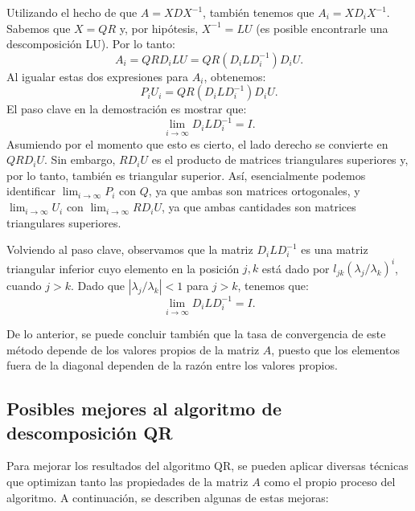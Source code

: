 Utilizando el hecho de que \( A = XDX^{-1} \), también tenemos que \( A_i = X D_i X^{-1} \). Sabemos que \( X = QR \) y, por hipótesis, \( X^{-1} = LU \) (es posible encontrarle una descomposición LU). Por lo tanto:
\[
A_i = QR D_i LU = QR(D_i L D_i^{-1})D_i U.
\]
Al igualar estas dos expresiones para \( A_i \), obtenemos:
\[
P_i U_i = QR(D_i L D_i^{-1})D_i U.
\]
El paso clave en la demostración es mostrar que:
\[
\lim_{i \to \infty} D_i L D_i^{-1} = I.
\]
Asumiendo por el momento que esto es cierto, el lado derecho se convierte en \( QR D_i U \). Sin embargo, \( R D_i U \) es el producto de matrices triangulares superiores y, por lo tanto, también es triangular superior. Así, esencialmente podemos identificar \( \lim_{i \to \infty} P_i \) con \( Q \), ya que ambas son matrices ortogonales, y \( \lim_{i \to \infty} U_i \) con \( \lim_{i \to \infty} R D_i U \), ya que ambas cantidades son matrices triangulares superiores. 

Volviendo al paso clave, observamos que la matriz \( D_i L D_i^{-1} \) es una matriz triangular inferior cuyo elemento en la posición \( j, k \) está dado por \( l_{jk}(\lambda_j / \lambda_k)^i \), cuando \( j > k \). Dado que \( |\lambda_j / \lambda_k| < 1 \) para \( j > k \), tenemos que:
\[
\lim_{i \to \infty} D_i L D_i^{-1} = I.
\]

De lo anterior, se puede concluir también que la tasa de convergencia de este método depende de los valores propios de la matriz $A$, puesto que los elementos fuera de la diagonal dependen de la razón entre los valores propios. 

\subsection{Posibles mejores al algoritmo de descomposición QR}


Para mejorar los resultados del algoritmo QR, se pueden aplicar diversas técnicas que optimizan tanto las propiedades de la matriz \( A \) como el propio proceso del algoritmo. A continuación, se describen algunas de estas mejoras:

